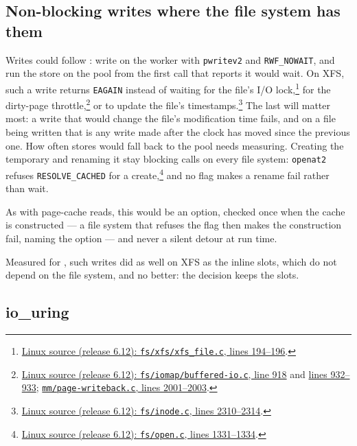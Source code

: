\subsection{Non-blocking writes where the file system has them}
\label{app:executor-nowait-writes}

Writes could follow : write on the worker
with \texttt{pwritev2} and \texttt{RWF\_NOWAIT}, and run the store on the
pool from the first call that reports it would wait. On XFS, such a write
returns \texttt{EAGAIN} instead of waiting for the file's I/O
lock,\footnote{\href{https://github.com/torvalds/linux/blob/v6.12/fs/xfs/xfs_file.c\#L194-L196}{Linux
source (release 6.12): \texttt{fs/xfs/xfs\_file.c}, lines 194--196}.} for the
dirty-page
throttle,\footnote{\href{https://github.com/torvalds/linux/blob/v6.12/fs/iomap/buffered-io.c\#L918}{Linux
source (release 6.12): \texttt{fs/iomap/buffered-io.c}, line 918} and
\href{https://github.com/torvalds/linux/blob/v6.12/fs/iomap/buffered-io.c\#L932-L933}{lines
932--933}; \href{https://github.com/torvalds/linux/blob/v6.12/mm/page-writeback.c\#L2001-L2003}{\texttt{mm/page-writeback.c},
lines 2001--2003}.} or to update the file's
timestamps.\footnote{\href{https://github.com/torvalds/linux/blob/v6.12/fs/inode.c\#L2310-L2314}{Linux
source (release 6.12): \texttt{fs/inode.c}, lines 2310--2314}.} The last will
matter most: a write that would change the file's modification time fails,
and on a file being written that is any write made after the clock has
moved since the previous one. How often stores would fall back to the pool
needs measuring. Creating the temporary and renaming it stay blocking calls
on every file system: \texttt{openat2} refuses \texttt{RESOLVE\_CACHED} for
a
create,\footnote{\href{https://github.com/torvalds/linux/blob/v6.12/fs/open.c\#L1331-L1334}{Linux
source (release 6.12): \texttt{fs/open.c}, lines 1331--1334}.} and no flag makes a
rename fail rather than wait.

As with page-cache reads, this would be an option, checked once when the
cache is constructed --- a file system that refuses the flag then makes the
construction fail, naming the option --- and never a silent detour at run
time.

Measured for , such writes did as well on
XFS as the inline slots, which do not depend on the file system, and no
better: the decision keeps the slots.

\subsection{io\_uring}
\label{app:executor-iouring}

